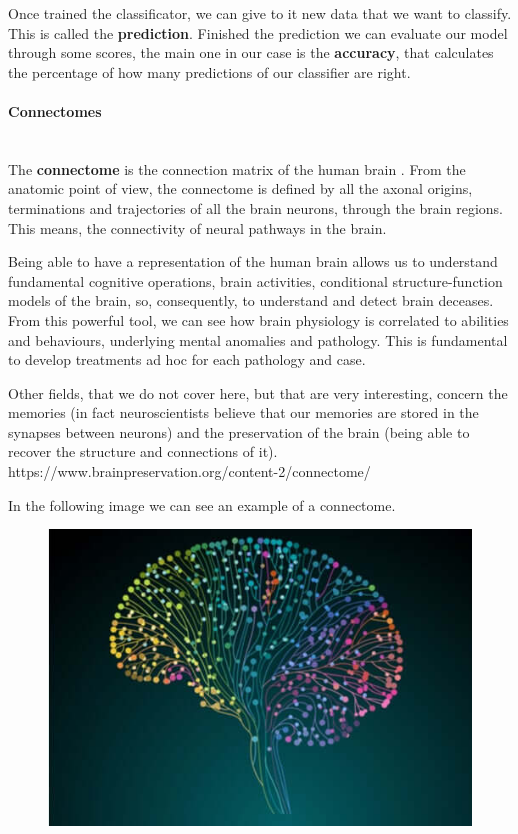 Once trained the classificator, we can give to it new data that we want to classify. This is called the \textbf{prediction}. Finished the prediction we can evaluate our model through some scores, the main one in our case is the \textbf{accuracy}, that calculates the percentage of how many predictions of our classifier are right. 

\paragraph{Connectomes}\
\\
The \textbf{connectome} is the connection matrix of the human brain \cite{connectome}. From the anatomic point of view, the connectome is defined by all the axonal origins, terminations and trajectories of all the brain neurons, through the brain regions. This means, the connectivity of neural pathways in the brain. 

Being able to have a representation of the human brain allows us to understand fundamental cognitive operations, brain activities, conditional structure-function models of the brain, so, consequently, to understand and detect brain deceases. From this powerful tool, we can see how brain physiology is correlated to abilities and behaviours, underlying mental anomalies and pathology. This is fundamental to develop treatments ad hoc for each pathology and case. 

Other fields, that we do not cover here, but that are very interesting, concern the memories (in fact neuroscientists believe that our memories are stored in the synapses between neurons) and the preservation of the brain (being able to recover the structure and connections of it).
https://www.brainpreservation.org/content-2/connectome/

In the following image we can see an example of a connectome.

\begin{figure}[htbp]
	\centering
	\includegraphics[scale=0.3]{Immagini/cervello-connessioni-neuroni-colorate.jpg}
	\caption{\label{fig:diagram3}}
\end{figure}



